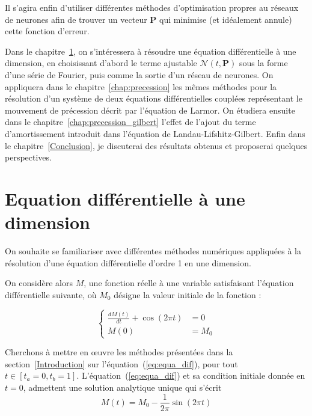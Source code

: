 \documentclass[12pt]{report}
\begin{document}
Il s'agira enfin d'utiliser différentes méthodes d'optimisation propres au réseaux de neurones afin de trouver un vecteur $\bm P$ qui minimise (et idéalement annule) cette fonction d'erreur.

Dans le chapitre~\ref{chap:ode_1}, on s'intéressera à résoudre une équation différentielle à une dimension, en choisissant d'abord le terme ajustable $\mathcal{N}(t,\bm{P})$ sous la forme d'une série de Fourier, puis comme la sortie d'un réseau de neurones.
On appliquera dans le chapitre~\ref{chap:precession} les mêmes méthodes pour la résolution d'un système de deux équations différentielles couplées représentant le mouvement de précession décrit par l'équation de Larmor.
On étudiera ensuite dans le chapitre~\ref{chap:precession_gilbert} l'effet de l'ajout du terme d'amortissement introduit dans l'équation de Landau-Lifshitz-Gilbert.
Enfin dans le chapitre~\ref{Conclusion}, je discuterai des résultats obtenus et proposerai quelques perspectives.


\chapter{Equation différentielle à une dimension}
\label{chap:ode_1}

On souhaite se familiariser avec différentes méthodes numériques appliquées à la résolution d'une équation différentielle d'ordre 1 en une dimension.

On considère alors $M$, une fonction réelle à une variable satisfaisant l'équation différentielle suivante, où $M_0$ désigne la valeur initiale de la fonction :

\begin{equation}
    \left\{
    \begin{aligned}
        \frac{dM(t)}{dt} + \cos(2\pi t) & = 0\\
        M(0)                            & = M_0
    \end{aligned}
    \right.
    \label{eq:equa_dif}
\end{equation}

Cherchons à mettre en {\oe}uvre les méthodes présentées dans la section~\ref{Introduction} sur l'équation~(\ref{eq:equa_dif}), pour tout $t\in [t_a=0,t_b=1]$.
L'équation~(\ref{eq:equa_dif}) et sa condition initiale donnée en $t=0$, admettent une solution analytique unique qui s'écrit
\begin{equation}
    {M}(t) = M_0 - \frac{1}{2\pi}\sin(2\pi t)
    \label{eq:solution_analytique}
\end{equation}
\end{document}
